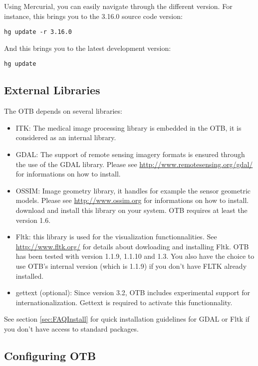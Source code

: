 Using Mercurial, you can easily navigate through the different version. For instance, this brings you to the 3.16.0 source code version:
\begin{verbatim}
hg update -r 3.16.0
\end{verbatim}

And this brings you to the latest development version:
\begin{verbatim}
hg update
\end{verbatim}


\subsection{External Libraries}

The OTB depends on several libraries:
\begin{itemize}
\item ITK: The medical image processing library is embedded in the OTB, it is considered as an internal library.
\item GDAL: The support of remote sensing imagery formats is ensured
  through the use of the GDAL library. Please see
  \url{http://www.remotesensing.org/gdal/} for informations on how to install.
\item OSSIM: Image geometry library, it handles for example the sensor geometric models.
  Please see \url{http://www.ossim.org} for informations on how to install.
download and install this library on your system. OTB requires at least the version 1.6.
\item Fltk: this library is used for the visualization
  functionnalities. See \url{http://www.fltk.org/} for details about
  dowloading and installing Fltk. OTB has been tested with version 1.1.9,
  1.1.10 and 1.3. You also have the choice to use OTB's internal
  version (which is 1.1.9) if you don't have FLTK already installed.
\item gettext (optional): Since version 3.2, OTB includes experimental support
  for internationalization. Gettext is required to activate this
  functionnality.
\end{itemize}

See section \ref{sec:FAQInstall} for quick installation guidelines for GDAL or Fltk if you don't have access
to standard packages.

\subsection{Configuring OTB}
\label{sec:ConfiguringOTB}

